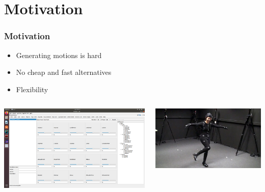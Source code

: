 \documentclass[14pt]{beamer}
\institute{Universit\"at Hamburg\\\trinstitute}
\title{\trtitle}
\subtitle{\trtype}
\author{\trauthor}
\date{}
\theoremstyle{remark}
\begin{document}
\renewcommand{\arraystretch}{1.2}

\begin{frame}[plain] %
  \titlepage
\end{frame}

\section{Motivation}
\begin{frame}[fragile]
    \frametitle{Motivation}
	\begin{itemize}
		\item Generating motions is hard
		\item No cheap and fast alternatives
		\item Flexibility
	\end{itemize}
    \begin{columns}
    	\begin{column}{0.5\linewidth}
    		\begin{center}
    		    \includegraphics[width=0.8\linewidth]{images/kfa.png}
    		\end{center}
    	\end{column}
        \begin{column}{0.5\linewidth}
        	\begin{center}
        		\includegraphics[height=0.3\textheight]{images/mocap.jpg}\cite{mocap}
        	\end{center}
        \end{column}
    \end{columns}
\end{frame}
\end{document}
